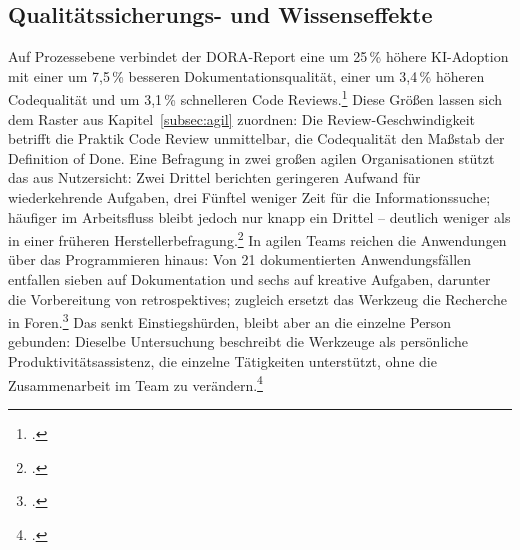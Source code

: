 \subsection{Qualitätssicherungs- und Wissenseffekte}\label{subsec:qualitaetswissen}
Auf Prozessebene verbindet der DORA-Report eine um 25\,\% höhere KI-Adoption mit einer um 7,5\,\% besseren Dokumentationsqualität, einer um 3,4\,\% höheren Codequalität und um 3,1\,\% schnelleren Code Reviews.\footcite[\vglf][]{DORA.2024} Diese Größen lassen sich dem Raster aus Kapitel~\ref{subsec:agil} zuordnen: Die Review-Geschwindigkeit betrifft die Praktik Code Review unmittelbar, die Codequalität den Maßstab der Definition of Done. Eine Befragung in zwei großen agilen Organisationen stützt das aus Nutzersicht: Zwei Drittel berichten geringeren Aufwand für wiederkehrende Aufgaben, drei Fünftel weniger Zeit für die Informationssuche; häufiger im Arbeitsfluss bleibt jedoch nur knapp ein Drittel -- deutlich weniger als in einer früheren Herstellerbefragung.\footcite[\vglf][]{Wivestad.2025} In agilen Teams reichen die Anwendungen über das Programmieren hinaus: Von 21 dokumentierten Anwendungsfällen entfallen sieben auf Dokumentation und sechs auf kreative Aufgaben, darunter die Vorbereitung von \glspl{retrospektive}; zugleich ersetzt das Werkzeug die Recherche in Foren.\footcite[\vglf][--300]{Neumann.2026} Das senkt Einstiegshürden, bleibt aber an die einzelne Person gebunden: Dieselbe Untersuchung beschreibt die Werkzeuge als persönliche Produktivitätsassistenz, die einzelne Tätigkeiten unterstützt, ohne die Zusammenarbeit im Team zu verändern.\footcite[\vglf][]{Neumann.2026}
